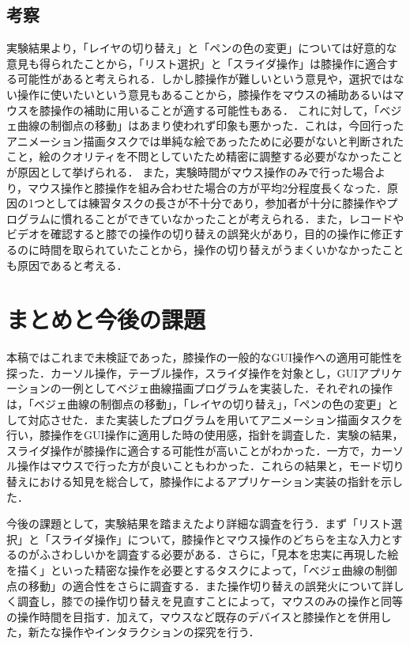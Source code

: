 \documentclass[submit, techrep]{ipsj}
\begin{document}
\subsection{考察}
実験結果より，「レイヤの切り替え」と「ペンの色の変更」については好意的な意見も得られたことから，「リスト選択」と「スライダ操作」は膝操作に適合する可能性があると考えられる．しかし膝操作が難しいという意見や，選択ではない操作に使いたいという意見もあることから，膝操作をマウスの補助あるいはマウスを膝操作の補助に用いることが適する可能性もある．
これに対して，「ベジェ曲線の制御点の移動」はあまり使われず印象も悪かった．これは，今回行ったアニメーション描画タスクでは単純な絵であったために必要がないと判断されたこと，絵のクオリティを不問としていたため精密に調整する必要がなかったことが原因として挙げられる．
また，実験時間がマウス操作のみで行った場合より，マウス操作と膝操作を組み合わせた場合の方が平均2分程度長くなった．原因の1つとしては練習タスクの長さが不十分であり，参加者が十分に膝操作やプログラムに慣れることができていなかったことが考えられる．また，レコードやビデオを確認すると膝での操作の切り替えの誤発火があり，目的の操作に修正するのに時間を取られていたことから，操作の切り替えがうまくいかなかったことも原因であると考える．
\section{まとめと今後の課題}
本稿ではこれまで未検証であった，膝操作の一般的なGUI操作への適用可能性を探った．カーソル操作，テーブル操作，スライダ操作を対象とし，GUIアプリケーションの一例としてベジェ曲線描画プログラムを実装した．それぞれの操作は，「ベジェ曲線の制御点の移動」，「レイヤの切り替え」，「ペンの色の変更」として対応させた．また実装したプログラムを用いてアニメーション描画タスクを行い，膝操作をGUI操作に適用した時の使用感，指針を調査した．実験の結果，スライダ操作が膝操作に適合する可能性が高いことがわかった．一方で，カーソル操作はマウスで行った方が良いこともわかった．これらの結果と，モード切り替えにおける知見を総合して，膝操作によるアプリケーション実装の指針を示した．\par
今後の課題として，実験結果を踏まえたより詳細な調査を行う．まず「リスト選択」と「スライダ操作」について，膝操作とマウス操作のどちらを主な入力とするのがふさわしいかを調査する必要がある．さらに，「見本を忠実に再現した絵を描く」といった精密な操作を必要とするタスクによって，「ベジェ曲線の制御点の移動」の適合性をさらに調査する．また操作切り替えの誤発火について詳しく調査し，膝での操作切り替えを見直すことによって，マウスのみの操作と同等の操作時間を目指す．加えて，マウスなど既存のデバイスと膝操作とを併用した，新たな操作やインタラクションの探究を行う．
\par

%
%
%




\begin{biography}

\end{biography}
\end{document}
